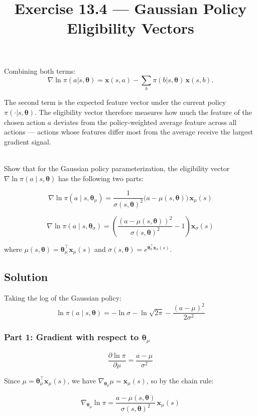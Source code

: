 \documentclass{article}
\begin{document}
Combining both terms:
\[
  \boxed{\nabla \ln \pi(a|s, \boldsymbol{\theta}) = \mathbf{x}(s,a) - \sum_b \pi(b|s,\boldsymbol{\theta})\,\mathbf{x}(s,b).}
\]

The second term is the expected feature vector under the current policy $\pi(\cdot|s,\boldsymbol{\theta})$.
The eligibility vector therefore measures how much the feature of the chosen action $a$
deviates from the policy-weighted average feature across all actions — actions whose
features differ most from the average receive the largest gradient signal.
\\\\
\title{\textbf{Exercise 13.4 --- Gaussian Policy Eligibility Vectors}}
Show that for the Gaussian policy parameterization, the eligibility vector
$\nabla \ln \pi(a \mid s, \boldsymbol{\theta})$ has the following two parts:

\[
\nabla \ln \pi(a \mid s, \boldsymbol{\theta}_\mu)
= \frac{1}{\sigma(s,\boldsymbol{\theta})^2}\bigl(a - \mu(s,\boldsymbol{\theta})\bigr)\,\mathbf{x}_\mu(s)
\]

\[
\nabla \ln \pi(a \mid s, \boldsymbol{\theta}_\sigma)
= \left(\frac{(a - \mu(s,\boldsymbol{\theta}))^2}{\sigma(s,\boldsymbol{\theta})^2} - 1\right)\mathbf{x}_\sigma(s)
\]

where $\mu(s,\boldsymbol{\theta}) = \boldsymbol{\theta}_\mu^\top \mathbf{x}_\mu(s)$ and
$\sigma(s,\boldsymbol{\theta}) = e^{\boldsymbol{\theta}_\sigma^\top \mathbf{x}_\sigma(s)}$.

\subsection*{Solution}

Taking the log of the Gaussian policy:
\[
\ln \pi(a \mid s, \boldsymbol{\theta})
= -\ln\sigma - \ln\sqrt{2\pi} - \frac{(a-\mu)^2}{2\sigma^2}
\]

\subsubsection*{Part 1: Gradient with respect to $\boldsymbol{\theta}_\mu$}

\[
\frac{\partial \ln\pi}{\partial \mu}
= \frac{a - \mu}{\sigma^2}
\]

Since $\mu = \boldsymbol{\theta}_\mu^\top \mathbf{x}_\mu(s)$, we have $\nabla_{\boldsymbol{\theta}_\mu}\mu = \mathbf{x}_\mu(s)$, so by the chain rule:

\[
\nabla_{\boldsymbol{\theta}_\mu} \ln\pi
= \frac{a - \mu(s,\boldsymbol{\theta})}{\sigma(s,\boldsymbol{\theta})^2}\,\mathbf{x}_\mu(s)
\]
\end{document}
